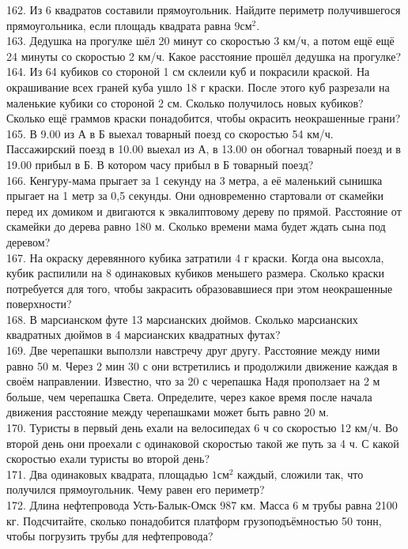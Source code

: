 \documentclass[12pt]{article}
\begin{document}
162. Из 6 квадратов составили прямоугольник. Найдите периметр получившегося прямоугольника, если площадь квадрата равна $9\text{см}^2.$\\
163. Дедушка на прогулке шёл 20 минут со скоростью 3 км/ч, а потом ещё ещё 24 минуты со скоростью 2 км/ч. Какое расстояние прошёл дедушка на прогулке?\\
164. Из 64 кубиков со стороной 1 см склеили куб и покрасили краской. На окрашивание всех граней куба ушло 18 г краски. После этого куб разрезали на маленькие кубики со стороной 2 см. Сколько получилось новых кубиков? Сколько ещё граммов краски понадобится, чтобы окрасить неокрашенные грани?\\
165. В 9.00 из А в Б выехал товарный поезд со скоростью 54 км/ч. Пассажирский поезд в 10.00 выехал из А, в 13.00 он обогнал товарный поезд и в 19.00 прибыл в Б. В котором часу прибыл в Б товарный поезд?\\
166. Кенгуру-мама прыгает за 1 секунду на 3 метра, а её маленький сынишка прыгает на 1 метр за 0,5 секунды. Они одновременно стартовали от скамейки перед их домиком и двигаются к эвкалиптовому дереву по прямой. Расстояние от скамейки до дерева равно 180 м. Сколько времени мама будет ждать сына под деревом?\\
167. На окраску деревянного кубика затратили 4 г краски. Когда она высохла, кубик распилили на 8 одинаковых кубиков меньшего размера. Сколько краски потребуется для того, чтобы закрасить образовавшиеся при этом неокрашенные поверхности?\\
168. В марсианском футе 13 марсианских дюймов. Сколько марсианских квадратных дюймов в 4 марсианских квадратных футах?\\
169. Две черепашки выползли навстречу друг другу. Расстояние между ними равно 50 м. Через 2 мин 30 с они встретились и продолжили движение каждая в своём направлении. Известно, что за 20 с черепашка Надя проползает на 2 м больше, чем черепашка Света. Определите, через какое время после начала движения расстояние между черепашками может быть равно 20 м.\\
170. Туристы в первый день ехали на велосипедах 6 ч со скоростью 12 км/ч. Во второй день они проехали с одинаковой скоростью такой же путь за 4 ч. С какой скоростью ехали туристы во второй день?\\
171. Два одинаковых квадрата, площадью $1\text{см}^2$ каждый, сложили так, что получился прямоугольник. Чему равен его периметр?\\
172. Длина нефтепровода Усть-Балык-Омск 987 км. Масса 6 м трубы равна 2100 кг. Подсчитайте, сколько понадобится платформ грузоподъёмностью 50 тонн, чтобы погрузить трубы для нефтепровода?\\
\end{document}
